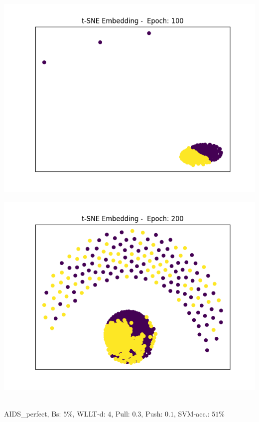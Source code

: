 \begin{frame}
	\begin{minipage}{0.4\textwidth}
		\includegraphics[width=\textwidth]{images/plot23tSNE}
	\end{minipage}
	\begin{minipage}{0.4\textwidth}
		\includegraphics[width=\textwidth]{images/plot24tSNE}
	\end{minipage}
	\vspace{2cm} \\
	\tiny{AIDS\_perfect, Bs: $5\%$, WLLT-d: $4$, Pull: $0.3$, Push: $0.1$, SVM-acc.: $51\%$}
\end{frame}

